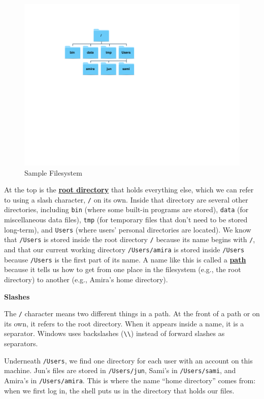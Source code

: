 \documentclass[
]{krantz}
\renewenvironment{quote}{\begin{VF}}{\end{VF}}
\newcommand{\gref}[2]{\hyperlink{#2}{\textbf{#1}}}
\begin{document}
\begin{figure}

{\centering \includegraphics[width=0.7\linewidth]{figures/bash-basics/sample-filesystem} 

}

\caption{Sample Filesystem}\label{fig:bash-basics-filesystem}
\end{figure}

At the top is the \gref{root directory}{root\_directory} that holds everything else,
which we can refer to using a slash character, \texttt{/} on its own.
Inside that directory are several other directories,
including \texttt{bin} (where some built-in programs are stored),
\texttt{data} (for miscellaneous data files),
\texttt{tmp} (for temporary files that don't need to be stored long-term),
and \texttt{Users} (where users' personal directories are located).
We know that \texttt{/Users} is stored inside the root directory \texttt{/} because its name begins with \texttt{/},
and that our current working directory \texttt{/Users/amira} is stored inside \texttt{/Users}
because \texttt{/Users} is the first part of its name.
A name like this is called a \gref{path}{path} because it tells us
how to get from one place in the filesystem (e.g., the root directory)
to another (e.g., Amira's home directory).

\begin{quote}
\textbf{Slashes}

The \texttt{/} character means two different things in a path.
At the front of a path or on its own,
it refers to the root directory.
When it appears inside a name, it is a separator.
Windows uses backslashes (\texttt{\textbackslash{}\textbackslash{}}) instead of forward slashes as separators.
\end{quote}

Underneath \texttt{/Users},
we find one directory for each user with an account on this machine.
Jun's files are stored in \texttt{/Users/jun},
Sami's in \texttt{/Users/sami},
and Amira's in \texttt{/Users/amira}.
This is where the name ``home directory'' comes from:
when we first log in,
the shell puts us in the directory that holds our files.
\end{document}
